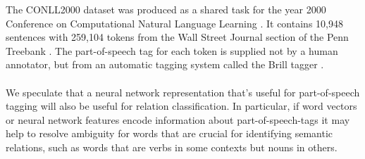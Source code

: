 \noindent
The CONLL2000 dataset was produced as a shared task for the year 2000 Conference on Computational Natural Language Learning \citep{kimsang2000}. It contains 10,948 sentences with 259,104 tokens from the Wall Street Journal section of the Penn Treebank \citep{marcus1999}. The part-of-speech tag for each token is supplied not by a human annotator, but from an automatic tagging system called the Brill tagger \citep{brill1992}.
\\\\
We speculate that a neural network representation that's useful for part-of-speech tagging will also be useful for relation classification. In particular, if word vectors or neural network features encode information about part-of-speech-tags it may help to resolve ambiguity for words that are crucial for identifying semantic relations, such as  words that are verbs in some contexts but nouns in others.

